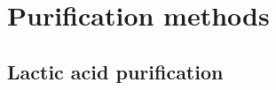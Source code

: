 \setlength{\headheight}{13.6pt}
\addtolength{\topmargin}{-1.6pt}
\newpage
\section{Purification methods}
\subsection{Lactic acid purification}